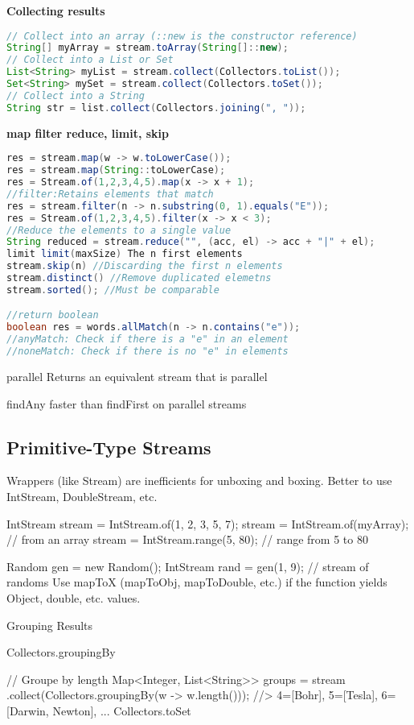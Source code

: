 \textbf{Collecting results}

\begin{lstlisting}[language=Java]
// Collect into an array (::new is the constructor reference)
String[] myArray = stream.toArray(String[]::new);
// Collect into a List or Set
List<String> myList = stream.collect(Collectors.toList());
Set<String> mySet = stream.collect(Collectors.toSet());
// Collect into a String
String str = list.collect(Collectors.joining(", "));
\end{lstlisting}

\textbf{map filter reduce, limit, skip}
\begin{lstlisting}[language=Java]
res = stream.map(w -> w.toLowerCase());
res = stream.map(String::toLowerCase);
res = Stream.of(1,2,3,4,5).map(x -> x + 1);
//filter:Retains elements that match
res = stream.filter(n -> n.substring(0, 1).equals("E"));
res = Stream.of(1,2,3,4,5).filter(x -> x < 3);
//Reduce the elements to a single value
String reduced = stream.reduce("", (acc, el) -> acc + "|" + el);
limit limit(maxSize) The n first elements
stream.skip(n) //Discarding the first n elements
stream.distinct() //Remove duplicated elemetns
stream.sorted(); //Must be comparable

//return boolean
boolean res = words.allMatch(n -> n.contains("e"));
//anyMatch: Check if there is a "e" in an element
//noneMatch: Check if there is no "e" in elements
\end{lstlisting}
parallel Returns an equivalent stream that is parallel

findAny faster than findFirst on parallel streams

\subsection{Primitive-Type Streams}
Wrappers (like Stream) are inefficients for unboxing and boxing. Better to use IntStream, DoubleStream, etc.

IntStream stream = IntStream.of(1, 2, 3, 5, 7);
stream = IntStream.of(myArray); // from an array
stream = IntStream.range(5, 80); // range from 5 to 80

Random gen = new Random();
IntStream rand = gen(1, 9); // stream of randoms
Use mapToX (mapToObj, mapToDouble, etc.) if the function yields Object, double, etc. values.

Grouping Results

Collectors.groupingBy

// Groupe by length
Map<Integer, List<String>> groups = stream
	.collect(Collectors.groupingBy(w -> w.length()));
//> 4=[Bohr], 5=[Tesla], 6=[Darwin, Newton], ...
Collectors.toSet

